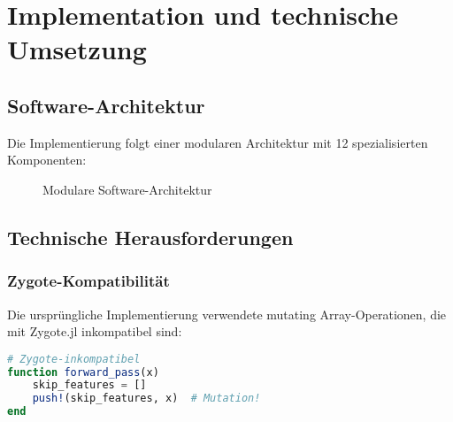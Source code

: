 
\chapter{Implementation und technische Umsetzung}
\label{ch:implementation}

\section{Software-Architektur}

Die Implementierung folgt einer modularen Architektur mit 12 spezialisierten Komponenten:

\begin{figure}[htbp]
\centering
{}
\caption{Modulare Software-Architektur}
\label{fig:architecture}
\end{figure}

\section{Technische Herausforderungen}

\subsection{Zygote-Kompatibilität}

Die ursprüngliche Implementierung verwendete mutating Array-Operationen, die mit Zygote.jl inkompatibel sind:

\begin{lstlisting}[language=Julia, caption={Problem: Mutating Arrays}]
# Zygote-inkompatibel
function forward_pass(x)
    skip_features = []
    push!(skip_features, x)  # Mutation!
end
\end{lstlisting}

